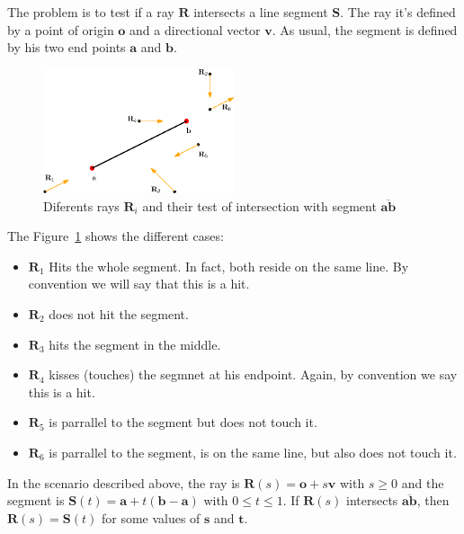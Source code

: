 The problem is to test if a ray $\mathbf{R}$ intersects a line segment $\mathbf{S}$.
The ray it's defined by a point of origin $\mathbf{o}$ and a directional vector $\mathbf{v}$.
As usual, the segment is defined by his two end points $\mathbf{a}$ and $\mathbf{b}$.

\begin{figure}[htb]
  \centering
  \includegraphics[width=0.50\textwidth]{img/segment2rays}
  \caption{Diferents rays $\mathbf{R}_i$ and their test of intersection with segment $\overline{\mathbf{a}\mathbf{b}}$}
  \label{fig:rays2seg}
\end{figure}

The Figure~\ref{fig:rays2seg} shows the different cases: 
\begin{itemize}
  \item $\mathbf{R}_1$ Hits the whole segment. In fact, both reside on the same line. By convention we will say that this is a hit.
  \item $\mathbf{R}_2$ does not hit the segment.
  \item $\mathbf{R}_3$ hits the segment in the middle.
  \item $\mathbf{R}_4$ kisses (touches) the segmnet at his endpoint. Again, by convention we say this is a hit.
  \item $\mathbf{R}_5$ is parrallel to the segment but does not touch it.
  \item $\mathbf{R}_6$ is parrallel to the segment, is on the same line, but also does not touch it.
\end{itemize}

In the scenario described above, the ray is $\mathbf{R}(s) = \mathbf{o} + s \mathbf{v}$ with $s \geq 0$ and the segment is $\mathbf{S}(t) = \mathbf{a} + t (\mathbf{b} - \mathbf{a})$ with $0 \leq t \leq 1$.
If $\mathbf{R}(s)$ intersects $\overline{\mathbf{a}\mathbf{b}}$, then $\mathbf{R}(s) = \mathbf{S}(t)$ for some values of $\mathbf{s}$ and $\mathbf{t}$.

